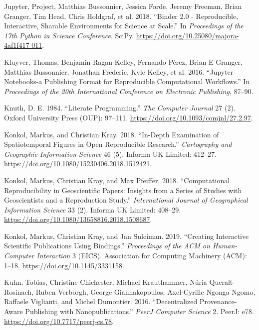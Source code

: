 \documentclass[onecolumn]{article}
\begin{document}
\leavevmode\hypertarget{ref-jupyter2018binder}{}%
Jupyter, Project, Matthias Bussonnier, Jessica Forde, Jeremy Freeman,
Brian Granger, Tim Head, Chris Holdgraf, et al. 2018. ``Binder 2.0 -
Reproducible, Interactive, Sharable Environments for Science at Scale.''
In \emph{Proceedings of the 17th Python in Science Conference}. SciPy.
\url{https://doi.org/10.25080/majora-4af1f417-011}.

\leavevmode\hypertarget{ref-kluyver2016jupyter}{}%
Kluyver, Thomas, Benjamin Ragan-Kelley, Fernando Pérez, Brian E Granger,
Matthias Bussonnier, Jonathan Frederic, Kyle Kelley, et al. 2016.
``Jupyter Notebooks-a Publishing Format for Reproducible Computational
Workflows.'' In \emph{Proceedings of the 20th International Conference
on Electronic Publishing}, 87--90.

\leavevmode\hypertarget{ref-knuth1984literate}{}%
Knuth, D. E. 1984. ``Literate Programming.'' \emph{The Computer Journal}
27 (2). Oxford University Press (OUP): 97--111.
\url{https://doi.org/10.1093/comjnl/27.2.97}.

\leavevmode\hypertarget{ref-konkol2019depth}{}%
Konkol, Markus, and Christian Kray. 2018. ``In-Depth Examination of
Spatiotemporal Figures in Open Reproducible Research.''
\emph{Cartography and Geographic Information Science} 46 (5). Informa UK
Limited: 412--27. \url{https://doi.org/10.1080/15230406.2018.1512421}.

\leavevmode\hypertarget{ref-konkol2019computational}{}%
Konkol, Markus, Christian Kray, and Max Pfeiffer. 2018. ``Computational
Reproducibility in Geoscientific Papers: Insights from a Series of
Studies with Geoscientists and a Reproduction Study.''
\emph{International Journal of Geographical Information Science} 33 (2).
Informa UK Limited: 408--29.
\url{https://doi.org/10.1080/13658816.2018.1508687}.

\leavevmode\hypertarget{ref-konkol2019creating}{}%
Konkol, Markus, Christian Kray, and Jan Suleiman. 2019. ``Creating
Interactive Scientific Publications Using Bindings.'' \emph{Proceedings
of the ACM on Human-Computer Interaction} 3 (EICS). Association for
Computing Machinery (ACM): 1--18. \url{https://doi.org/10.1145/3331158}.

\leavevmode\hypertarget{ref-kuhn2016decentralized}{}%
Kuhn, Tobias, Christine Chichester, Michael Krauthammer, Núria
Queralt-Rosinach, Ruben Verborgh, George Giannakopoulos, Axel-Cyrille
Ngonga Ngomo, Raffaele Viglianti, and Michel Dumontier. 2016.
``Decentralized Provenance-Aware Publishing with Nanopublications.''
\emph{PeerJ Computer Science} 2. PeerJ: e78.
\url{https://doi.org/10.7717/peerj-cs.78}.
\end{document}

